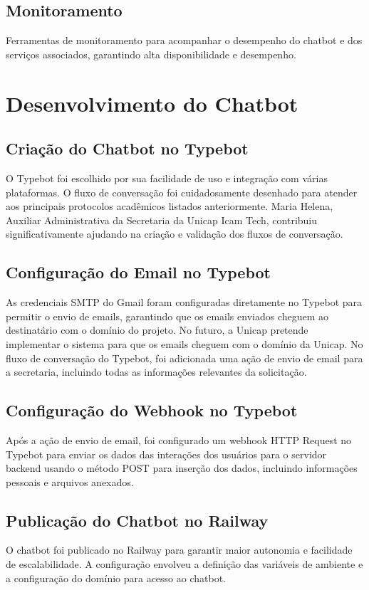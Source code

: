 \documentclass[12pt,a4paper]{article} %
\begin{document}
\subsection{Monitoramento}
Ferramentas de monitoramento para acompanhar o desempenho do chatbot e dos serviços associados, garantindo alta disponibilidade e desempenho.

\section{Desenvolvimento do Chatbot}

\subsection{Criação do Chatbot no Typebot}
O Typebot foi escolhido por sua facilidade de uso e integração com várias plataformas. O fluxo de conversação foi cuidadosamente desenhado para atender aos principais protocolos acadêmicos listados anteriormente. Maria Helena, Auxiliar Administrativa da Secretaria da Unicap Icam Tech, contribuiu significativamente ajudando na criação e validação dos fluxos de conversação.

\subsection{Configuração do Email no Typebot}
As credenciais SMTP do Gmail foram configuradas diretamente no Typebot para permitir o envio de emails, garantindo que os emails enviados cheguem ao destinatário com o domínio do projeto. No futuro, a Unicap pretende implementar o sistema para que os emails cheguem com o domínio da Unicap. No fluxo de conversação do Typebot, foi adicionada uma ação de envio de email para a secretaria, incluindo todas as informações relevantes da solicitação.

\subsection{Configuração do Webhook no Typebot}
Após a ação de envio de email, foi configurado um webhook HTTP Request no Typebot para enviar os dados das interações dos usuários para o servidor backend usando o método POST para inserção dos dados, incluindo informações pessoais e arquivos anexados.

\subsection{Publicação do Chatbot no Railway}
O chatbot foi publicado no Railway para garantir maior autonomia e facilidade de escalabilidade. A configuração envolveu a definição das variáveis de ambiente e a configuração do domínio para acesso ao chatbot.
\end{document}
